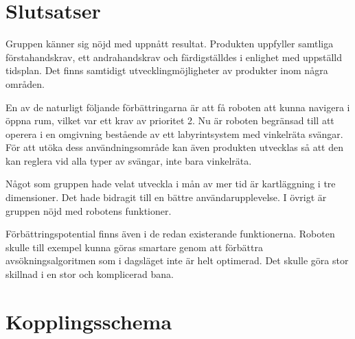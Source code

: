 \documentclass[11pt]{article}
\begin{document}
\begin{flushleft}
\pagebreak
\section{Slutsatser}

Gruppen känner sig nöjd med uppnått resultat. Produkten uppfyller samtliga förstahandskrav, ett andrahandskrav och färdigställdes i enlighet med uppställd tidsplan. Det finns samtidigt utvecklingmöjligheter av produkter inom några områden. 

En av de naturligt följande förbättringarna är att få roboten att kunna navigera i öppna rum, vilket var ett krav av prioritet 2. Nu är roboten begränsad till att operera i en omgivning bestående av ett labyrintsystem med vinkelräta svängar. För att utöka dess användningsområde kan även produkten utvecklas så att den kan reglera vid alla typer av svängar, inte bara vinkelräta.

Något som gruppen hade velat utveckla i mån av mer tid är kartläggning i tre dimensioner. Det hade bidragit till en bättre användarupplevelse. I övrigt är gruppen nöjd med robotens funktioner. 

Förbättringspotential finns även i de redan existerande funktionerna. Roboten skulle till exempel kunna göras smartare genom att förbättra avsökningsalgoritmen som i dagsläget inte är helt optimerad. Det skulle göra stor skillnad i en stor och komplicerad bana. 
\pagebreak





\pagebreak
\appendix
\setcounter{section}{14}
\section{Kopplingsschema}


\end{flushleft}
\end{document}
